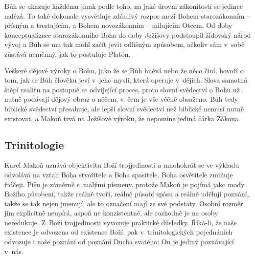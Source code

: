 Bůh se ukazuje každému jinak podle toho, na jaké úrovni zákonitostí se jedinec
nalézá. To také dokonale vysvětluje zdánlivý rozpor mezi Bohem starozákonním --
přísným a trestajícím, a Bohem novozákonním -- milujícím Otcem. Od doby
konceptualizace starozákonního Boha do doby Ježíšovy podstoupil židovský národ
vývoj a Bůh se mu tak mohl začít jevit odlišným způsobem, ačkoliv sám v~sobě
zůstává neměnný, jak to postuluje Platón.

Veškeré dějové výroky o Bohu, jako že se Bůh hněvá nebo že něco činí, hovoří o
tom, jak se Bůh člověku jeví v~jeho mysli, která operuje v~dějích. Slova samotná
štěpí realitu na postupně se odvíjející proces, proto slovní svědectví o Bohu už
nutně podávají dějový obraz o něčem, v~čem je vše věčně obsaženo. Bůh tedy
biblické svědectví přesahuje, ale lepší slovní svědectví než biblické nemusí
nutně existovat, a Makoň trvá na Ježíšově výroku, že nepomine jediná čárka
Zákona.

\subsection{Trinitologie}

Karel Makoň uznává objektivitu Boží trojjedinosti a mnohokrát se ve výkladu
odvolává na vztah Boha stvořitele a Boha spasitele. Boha osvětitele zmiňuje
řidčeji. Píšu je záměrně s~malými
písmeny, protože Makoň je pojímá jako mody Božího působení, takže reálně tvoří,
reálně působí spásu a reálně udělují poznání, takže se tak nejen jmenují, ale to označení mají ze své
podstaty. Osobní rozměr jim explicitně neupírá, aspoň ne konzistentně, ale
rozhodně je na osoby neredukuje. Z~Boží trojjedinosti vyvozuje praktické důsledky.
Říká-li, že naše existence je odvozena od existence Boží, pak v~trinitologických
pojednáních odvozuje i naše poznání od poznání Ducha svatého: On je jediný
poznávající v~nás.


